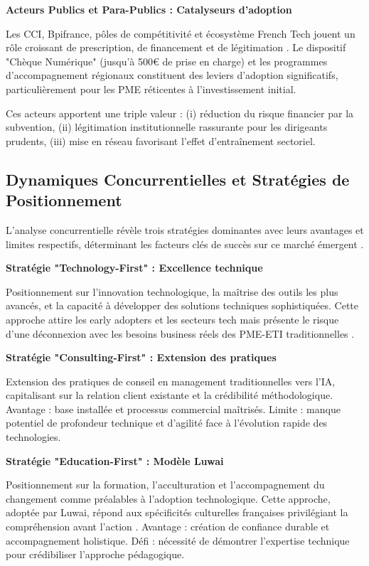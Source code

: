 \textbf{Acteurs Publics et Para-Publics : Catalyseurs d'adoption}

Les CCI, Bpifrance, pôles de compétitivité et écosystème French Tech jouent un rôle croissant de prescription, de financement et de légitimation \cite{france_strategie2025make}. Le dispositif "Chèque Numérique" (jusqu'à 500€ de prise en charge) et les programmes d'accompagnement régionaux constituent des leviers d'adoption significatifs, particulièrement pour les PME réticentes à l'investissement initial.

Ces acteurs apportent une triple valeur : (i) réduction du risque financier par la subvention, (ii) légitimation institutionnelle rassurante pour les dirigeants prudents, (iii) mise en réseau favorisant l'effet d'entraînement sectoriel.

\subsection{Dynamiques Concurrentielles et Stratégies de Positionnement}

L'analyse concurrentielle révèle trois stratégies dominantes avec leurs avantages et limites respectifs, déterminant les facteurs clés de succès sur ce marché émergent \cite{porter1985competitive}.

\textbf{Stratégie "Technology-First" : Excellence technique}

Positionnement sur l'innovation technologique, la maîtrise des outils les plus avancés, et la capacité à développer des solutions techniques sophistiquées. Cette approche attire les early adopters et les secteurs tech mais présente le risque d'une déconnexion avec les besoins business réels des PME-ETI traditionnelles \cite{christensen1997innovator}.

\textbf{Stratégie "Consulting-First" : Extension des pratiques}

Extension des pratiques de conseil en management traditionnelles vers l'IA, capitalisant sur la relation client existante et la crédibilité méthodologique. Avantage : base installée et processus commercial maîtrisés. Limite : manque potentiel de profondeur technique et d'agilité face à l'évolution rapide des technologies.

\textbf{Stratégie "Education-First" : Modèle Luwai}

Positionnement sur la formation, l'acculturation et l'accompagnement du changement comme préalables à l'adoption technologique. Cette approche, adoptée par Luwai, répond aux spécificités culturelles françaises privilégiant la compréhension avant l'action \cite{hofstede2001culture}. Avantage : création de confiance durable et accompagnement holistique. Défi : nécessité de démontrer l'expertise technique pour crédibiliser l'approche pédagogique.

